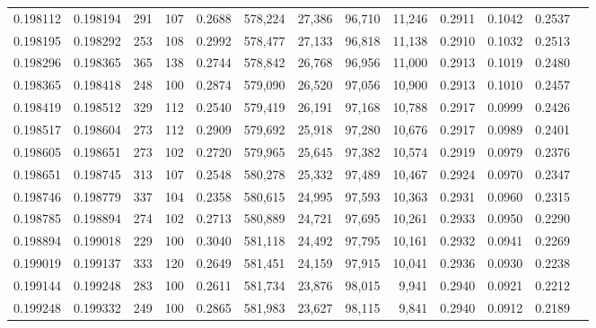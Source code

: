 \begin{tabular}{rrrrrrrrrrrrr}
0.198112 & 0.198194 &   291 & 107 &                                     0.2688 & 578,224 &  27,386 &  96,710 &  11,246 & 0.2911 & 0.1042 & 0.2537 \\
0.198195 & 0.198292 &   253 & 108 &                                     0.2992 & 578,477 &  27,133 &  96,818 &  11,138 & 0.2910 & 0.1032 & 0.2513 \\
0.198296 & 0.198365 &   365 & 138 &                                     0.2744 & 578,842 &  26,768 &  96,956 &  11,000 & 0.2913 & 0.1019 & 0.2480 \\
0.198365 & 0.198418 &   248 & 100 &                                     0.2874 & 579,090 &  26,520 &  97,056 &  10,900 & 0.2913 & 0.1010 & 0.2457 \\
0.198419 & 0.198512 &   329 & 112 &                                     0.2540 & 579,419 &  26,191 &  97,168 &  10,788 & 0.2917 & 0.0999 & 0.2426 \\
0.198517 & 0.198604 &   273 & 112 &                                     0.2909 & 579,692 &  25,918 &  97,280 &  10,676 & 0.2917 & 0.0989 & 0.2401 \\
0.198605 & 0.198651 &   273 & 102 &                                     0.2720 & 579,965 &  25,645 &  97,382 &  10,574 & 0.2919 & 0.0979 & 0.2376 \\
0.198651 & 0.198745 &   313 & 107 &                                     0.2548 & 580,278 &  25,332 &  97,489 &  10,467 & 0.2924 & 0.0970 & 0.2347 \\
0.198746 & 0.198779 &   337 & 104 &                                     0.2358 & 580,615 &  24,995 &  97,593 &  10,363 & 0.2931 & 0.0960 & 0.2315 \\
0.198785 & 0.198894 &   274 & 102 &                                     0.2713 & 580,889 &  24,721 &  97,695 &  10,261 & 0.2933 & 0.0950 & 0.2290 \\
0.198894 & 0.199018 &   229 & 100 &                                     0.3040 & 581,118 &  24,492 &  97,795 &  10,161 & 0.2932 & 0.0941 & 0.2269 \\
0.199019 & 0.199137 &   333 & 120 &                                     0.2649 & 581,451 &  24,159 &  97,915 &  10,041 & 0.2936 & 0.0930 & 0.2238 \\
0.199144 & 0.199248 &   283 & 100 &                                     0.2611 & 581,734 &  23,876 &  98,015 &   9,941 & 0.2940 & 0.0921 & 0.2212 \\
0.199248 & 0.199332 &   249 & 100 &                                     0.2865 & 581,983 &  23,627 &  98,115 &   9,841 & 0.2940 & 0.0912 & 0.2189 \\

\end{tabular}
